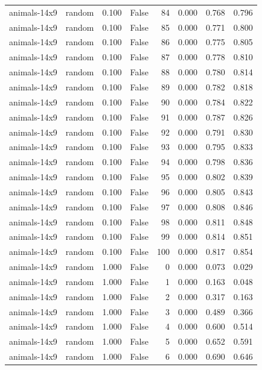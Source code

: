 \begin{tabular}{llrrrrrr}
animals-14x9 & random & 0.100 & False & 84 & 0.000 & 0.768 & 0.796 \\
animals-14x9 & random & 0.100 & False & 85 & 0.000 & 0.771 & 0.800 \\
animals-14x9 & random & 0.100 & False & 86 & 0.000 & 0.775 & 0.805 \\
animals-14x9 & random & 0.100 & False & 87 & 0.000 & 0.778 & 0.810 \\
animals-14x9 & random & 0.100 & False & 88 & 0.000 & 0.780 & 0.814 \\
animals-14x9 & random & 0.100 & False & 89 & 0.000 & 0.782 & 0.818 \\
animals-14x9 & random & 0.100 & False & 90 & 0.000 & 0.784 & 0.822 \\
animals-14x9 & random & 0.100 & False & 91 & 0.000 & 0.787 & 0.826 \\
animals-14x9 & random & 0.100 & False & 92 & 0.000 & 0.791 & 0.830 \\
animals-14x9 & random & 0.100 & False & 93 & 0.000 & 0.795 & 0.833 \\
animals-14x9 & random & 0.100 & False & 94 & 0.000 & 0.798 & 0.836 \\
animals-14x9 & random & 0.100 & False & 95 & 0.000 & 0.802 & 0.839 \\
animals-14x9 & random & 0.100 & False & 96 & 0.000 & 0.805 & 0.843 \\
animals-14x9 & random & 0.100 & False & 97 & 0.000 & 0.808 & 0.846 \\
animals-14x9 & random & 0.100 & False & 98 & 0.000 & 0.811 & 0.848 \\
animals-14x9 & random & 0.100 & False & 99 & 0.000 & 0.814 & 0.851 \\
animals-14x9 & random & 0.100 & False & 100 & 0.000 & 0.817 & 0.854 \\
animals-14x9 & random & 1.000 & False & 0 & 0.000 & 0.073 & 0.029 \\
animals-14x9 & random & 1.000 & False & 1 & 0.000 & 0.163 & 0.048 \\
animals-14x9 & random & 1.000 & False & 2 & 0.000 & 0.317 & 0.163 \\
animals-14x9 & random & 1.000 & False & 3 & 0.000 & 0.489 & 0.366 \\
animals-14x9 & random & 1.000 & False & 4 & 0.000 & 0.600 & 0.514 \\
animals-14x9 & random & 1.000 & False & 5 & 0.000 & 0.652 & 0.591 \\
animals-14x9 & random & 1.000 & False & 6 & 0.000 & 0.690 & 0.646 \\

\end{tabular}
